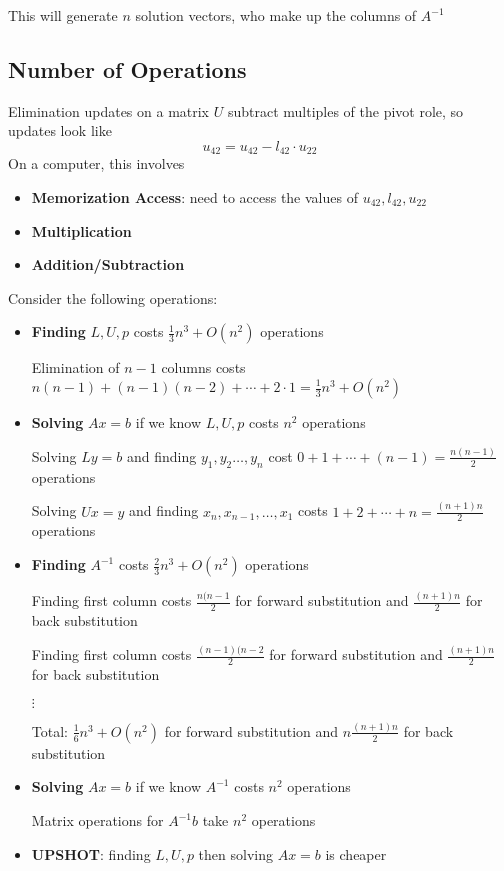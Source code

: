 \documentclass{article}
\begin{document}
This will generate $n$ solution vectors, who make up the columns of $A^{-1}$

\subsection{Number of Operations}
Elimination updates on a matrix $U$ subtract multiples of the pivot role, so updates look like
\[ u_{42} = u_{42} - l_{42} \cdot u_{22} \]
On a computer, this involves
\begin{itemize}
  \item \textbf{Memorization Access}: need to access the values of $u_{42}, l_{42}, u_{22}$ 
  \item \textbf{Multiplication}
  \item \textbf{Addition/Subtraction}
\end{itemize}

Consider the following operations:
\begin{itemize}
  \item \textbf{Finding} $L, U, p$ costs $\frac{1}{3}n^3 + O(n^2)$ operations

  Elimination of $n-1$ columns costs $n(n-1) + (n-1)(n-2) + \cdots + 2 \cdot 1 = \frac{1}{3}n^3 + O(n^2)$

  \item \textbf{Solving} $Ax = b$ if we know $L, U, p$ costs $n^2$ operations

    Solving $Ly = b$ and finding $y_1, y_2 \ldots, y_n$ cost $0 + 1 + \cdots + (n-1) = \frac{n(n-1)}{2}$ operations

    Solving $Ux = y$ and finding $x_{n}, x_{n-1}, \ldots, x_{1}$ costs $1 + 2 + \cdots + n = \frac{(n+1)n}{2}$ operations
  \item \textbf{Finding} $A^{-1}$ costs $\frac{2}{3}n^3 + O(n^2)$ operations

  Finding first column costs $\frac{n(n-1}{2}$ for forward substitution and $\frac{(n+1)n}{2}$ for back substitution

  Finding first column costs $\frac{(n-1)(n-2}{2}$ for forward substitution and $\frac{(n+1)n}{2}$ for back substitution

  $\vdots$

  Total: $\frac{1}{6} n^3 + O(n^2)$ for forward substitution and $n \frac{(n+1)n}{2}$ for back substitution

  \item \textbf{Solving} $Ax = b$ if we know $A^{-1}$ costs $n^2$ operations

    Matrix operations for $A^{-1}b$ take $n^2$ operations

  \item \textbf{UPSHOT}: finding $L, U, p$ then solving $Ax = b$ is cheaper
\end{itemize}
\end{document}
